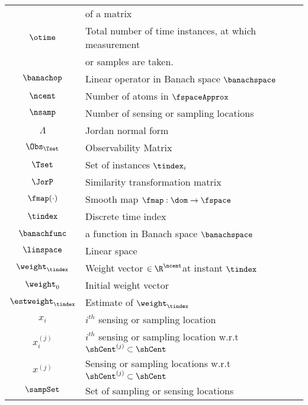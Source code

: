 \begin{table}[tbh]
\begin{tabular}{ cl  }
	&  of a matrix \\
	$ \otime $ & Total number of time instances, at which measurement \\
	& or samples are taken.\\
	$ \banachop $ & Linear operator in Banach space $\banachspace$\\
	$ \ncent $ & Number of atoms in $ \fspaceApprox $\\
	$ \nsamp $ & Number of sensing or sampling locations \\
	$ \Lambda $ & Jordan normal form \\
	$ \Obs_{\Tset} $ & Observability Matrix\\
	$ \Tset $ & Set of instances $ \tindex_i $\\
	$ \JorP $ & Similarity transformation matrix \\
	$ \fmap(\cdot) $ & Smooth map $ \fmap : \dom \rightarrow \fspace $\\
	$ \tindex $ & Discrete time index\\
	$ \banachfunc $ & a function in Banach space 	$\banachspace$\\
	$ \linspace $ & Linear space\\
	$ \weight_{\tindex} $ & Weight vector $ \in \R^{\ncent} $at instant $ \tindex $\\
	$ \weight_0 $ & Initial weight vector\\
	$\estweight_{\tindex}$ & Estimate of $ \weight_{\tindex} $\\
	$ x_i $ & $ i^{th} $ sensing or sampling location\\
	$ x_i^{(j)}$ & $ i^{th} $ sensing or sampling location w.r.t $ \shCent^{(j)} \subset \shCent $\\
	$ x^{(j)}$ & Sensing or sampling locations w.r.t  $ \shCent^{(j)} \subset \shCent $\\
	$ \sampSet $ & Set of sampling or sensing locations\\
	
	\hline
\end{tabular}
\end{table}
